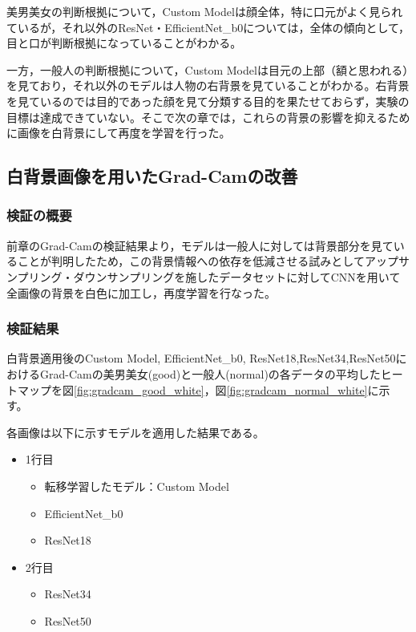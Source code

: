 \documentclass[a4paper,11pt,titlepage]{jsarticle}
\begin{document}
美男美女の判断根拠について，Custom Modelは顔全体，特に口元がよく見られているが，それ以外のResNet・EfficientNet\_b0については，全体の傾向として，目と口が判断根拠になっていることがわかる。\par
一方，一般人の判断根拠について，Custom Modelは目元の上部（額と思われる）を見ており，それ以外のモデルは人物の右背景を見ていることがわかる。右背景を見ているのでは目的であった顔を見て分類する目的を果たせておらず，実験の目標は達成できていない。そこで次の章では，これらの背景の影響を抑えるために画像を白背景にして再度を学習を行った。



\clearpage

\subsection{白背景画像を用いたGrad-Camの改善}
\subsubsection{検証の概要}
前章のGrad-Camの検証結果より，モデルは一般人に対しては背景部分を見ていることが判明したため，この背景情報への依存を低減させる試みとしてアップサンプリング・ダウンサンプリングを施したデータセットに対してCNNを用いて全画像の背景を白色に加工し，再度学習を行なった。

\subsubsection{検証結果}
白背景適用後のCustom Model, EfficientNet\_b0, ResNet18,ResNet34,ResNet50におけるGrad-Camの美男美女(good)と一般人(normal)の各データの平均したヒートマップを図\ref{fig:gradcam_good_white}，図\ref{fig:gradcam_normal_white}に示す。

各画像は以下に示すモデルを適用した結果である。
\begin{itemize}
	\item 1行目
	\begin{itemize}
	\item 転移学習したモデル：Custom Model
	\item EfficientNet\_b0
	\item ResNet18
	\end{itemize}
	\item 2行目
	\begin{itemize}
	\item ResNet34
	\item ResNet50
	\end{itemize}
\end{itemize}
\end{document}
